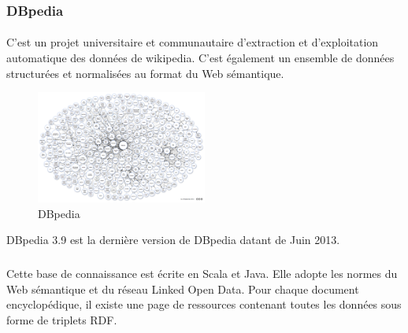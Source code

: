 \documentclass[12pt,a4	]{report}
\begin{document}
\subsubsection*{DBpedia}
\paragraph{}

C'est un projet universitaire et communautaire d’extraction et d’exploitation automatique des données de wikipedia. C’est également un ensemble de données structurées et normalisées au format du Web sémantique.
\begin{figure}
\vspace{-10pt}
\begin{center}
\includegraphics[width=0.50\textwidth]{dbpedia.png}
\end{center}
\vspace{-15pt}
\caption{DBpedia}
\vspace{-10pt}
\end{figure}
DBpedia 3.9 est la dernière version de DBpedia datant de Juin 2013.
\subparagraph{}
Cette base de connaissance est écrite en Scala et Java. Elle adopte les normes du Web sémantique et du réseau Linked Open Data. Pour chaque document encyclopédique, il existe une page de ressources contenant toutes les données sous forme de triplets RDF.
\newpage
\end{document}
